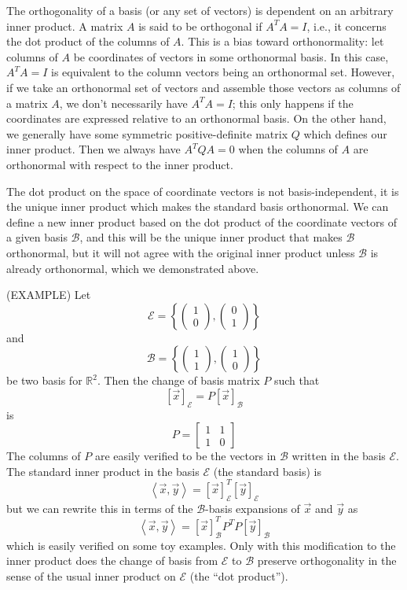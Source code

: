 The orthogonality of a basis (or any set of vectors) is dependent on an arbitrary inner product. A matrix $A$ is said to be orthogonal if $A^TA = I$, i.e., it concerns the dot product of the columns of $A$. This is a bias toward orthonormality: let columns of $A$ be coordinates of vectors in some orthonormal basis. In this case, $A^TA = I$ is equivalent to the column vectors being an orthonormal set. However, if we take an orthonormal set of vectors and assemble those vectors as columns of a matrix $A$, we don't necessarily have $A^TA = I$; this only happens if the coordinates are expressed relative to an orthonormal basis. On the other hand, we generally have some symmetric positive-definite matrix $Q$ which defines our inner product. Then we always have $A^TQA = 0$ when the columns of $A$ are orthonormal with respect to the inner product.

The dot product on the space of coordinate vectors is not basis-independent, it is the unique inner product which makes the standard basis orthonormal. We can define a new inner product based on the dot product of the coordinate vectors of a given basis $\mathcal{B}$, and this will be the unique inner product that makes $\mathcal{B}$ orthonormal, but it will not agree with the original inner product unless $\mathcal{B}$ is already orthonormal, which we demonstrated above.


(EXAMPLE)
Let \[ \mathcal{E} = \left\{ \left( \begin{array}{c} 1 \\ 0 \end{array}\right), \left( \begin{array}{c} 0\\ 1 \end{array} \right) \right\} \] and \[ \mathcal{B} = \left\{ \left( \begin{array}{c} 1 \\ 1 \end{array}\right), \left( \begin{array}{c} 1 \\ 0  \end{array} \right) \right\} \] be two basis for $\mathbb{R}^2$. Then the change of basis matrix $P$ such that \[ \left[ \vec{x} \right]_{\mathcal{E}} = P \left[ \vec{x} \right]_{\mathcal{B}} \] is \[ P = \left[ \begin{array}{cc} 1 & 1 \\ 1 & 0 \end{array} \right] \] The columns of $P$ are easily verified to be the vectors in $\mathcal{B}$ written in the basis $\mathcal{E}$. The standard inner product in the basis $\mathcal{E}$ (the standard basis) is \[ \left\langle \vec{x}, \vec{y} \right\rangle = \left[ \vec{x} \right]_{\mathcal{E}}^T \left[ \vec{y} \right]_{\mathcal{E}} \] but we can rewrite this in terms of the $\mathcal{B}$-basis expansions of $\vec{x}$ and $\vec{y}$ as
\[ \left\langle \vec{x}, \vec{y} \right\rangle = \left[ \vec{x}\right]_{\mathcal{B}}^T P^T P \left[\vec{y}\right]_{\mathcal{B}} \] which is easily verified on some toy examples. Only with this modification to the inner product does the change of basis from $\mathcal{E}$ to $\mathcal{B}$ preserve orthogonality in the sense of the usual inner product on $\mathcal{E}$ (the ``dot product'').


